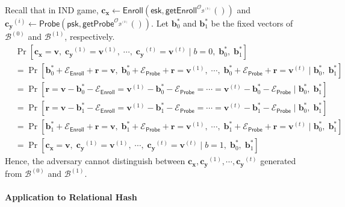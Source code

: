 Recall that in \textsf{IND} game, $\mathbf{c_x} \gets \textsf{Enroll}(\textsf{esk}, \textsf{getEnroll}^{\mathcal{O}_{\mathcal{B}^{(b)}}}() )$ and $\mathbf{c_y}^{(i)} \gets \textsf{Probe}(\textsf{psk}, \textsf{getProbe}^{\mathcal{O}_{\mathcal{B}^{(b)}}}() )$. Let $\mathbf{b}^*_0$ and $\mathbf{b}^*_1$ be the fixed vectors of $\mathcal{B}^{(0)}$ and $\mathcal{B}^{(1)}$, respectively.
\begin{align*}
	& \Pr[ \mathbf{c_x} = \mathbf{v},\; \mathbf{c_y}^{(1)} = \mathbf{v}^{(1)},\; \cdots,\; \mathbf{c_y}^{(t)} = \mathbf{v}^{(t)} \mid b = 0,\; \mathbf{b}^*_0,\; \mathbf{b}^*_1 ] \\
	&= \Pr[ \mathbf{b}^*_0 + \mathcal{E}_{\textsf{Enroll}} + \mathbf{r} = \mathbf{v},\; \mathbf{b}^*_0 + \mathcal{E}_{\textsf{Probe}} + \mathbf{r} =\mathbf{v}^{(1)},\; \cdots,\; \mathbf{b}^*_0 + \mathcal{E}_{\textsf{Probe}} + \mathbf{r} =\mathbf{v}^{(t)} \mid \mathbf{b}^*_0,\; \mathbf{b}^*_1] \\ 
	&= \Pr[ \mathbf{r} = \mathbf{v} - \mathbf{b}^*_0 - \mathcal{E}_{\textsf{Enroll}} =\mathbf{v}^{(1)} - \mathbf{b}^*_0 - \mathcal{E}_{\textsf{Probe}} = \cdots = \mathbf{v}^{(t)} - \mathbf{b}^*_0 - \mathcal{E}_{\textsf{Probe}} \mid \mathbf{b}^*_0,\; \mathbf{b}^*_1] \\ 
	&= \Pr[ \mathbf{r} = \mathbf{v} - \mathbf{b}^*_1 - \mathcal{E}_{\textsf{Enroll}} = \mathbf{v}^{(1)} - \mathbf{b}^*_1 - \mathcal{E}_{\textsf{Probe}} = \cdots = \mathbf{v}^{(t)} - \mathbf{b}^*_1 - \mathcal{E}_{\textsf{Probe}} \mid \mathbf{b}^*_0,\; \mathbf{b}^*_1] \\ 
	&= \Pr[ \mathbf{b}^*_1 + \mathcal{E}_{\textsf{Enroll}} + \mathbf{r} = \mathbf{v},\; \mathbf{b}^*_1 + \mathcal{E}_{\textsf{Probe}} + \mathbf{r} =\mathbf{v}^{(1)},\; \cdots,\; \mathbf{b}^*_1 + \mathcal{E}_{\textsf{Probe}} + \mathbf{r} =\mathbf{v}^{(t)} \mid \mathbf{b}^*_0,\; \mathbf{b}^*_1] \\ 
	&= \Pr[ \mathbf{c_x} = \mathbf{v},\; \mathbf{c_y}^{(1)} = \mathbf{v}^{(1)},\; \cdots,\; \mathbf{c_y}^{(t)} = \mathbf{v}^{(t)} \mid b = 1,\; \mathbf{b}^*_0,\; \mathbf{b}^*_1  ]
\end{align*}
Hence, the adversary cannot distinguish between $\mathbf{c_x}, \mathbf{c_y}^{(1)}, \cdots, \mathbf{c_y}^{(t)}$ generated from $\mathcal{B}^{(0)}$ and $\mathcal{B}^{(1)}$.


\paragraph{Application to Relational Hash}

